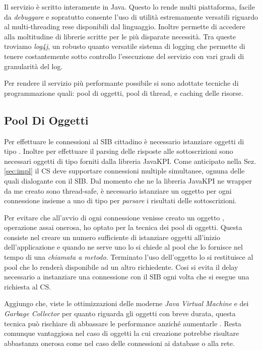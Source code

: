 Il servizio è scritto interamente in Java. Questo lo rende multi piattaforma, facile da \emph{debuggare} e sopratutto consente l'uso di utilità estremamente versatili riguardo al multi-threading rese disponibili dal linguaggio. Inoltre permette di accedere alla moltitudine di librerie scritte per le più disparate necessità. Tra queste troviamo \emph{log4j}, un robusto quanto versatile sistema di logging che permette di tenere costantemente sotto controllo l'esecuzione del servizio con vari gradi di granularità del log.

Per rendere il servizio più performante possibile si sono adottate tecniche di programmazione quali: pool di oggetti, pool di thread, e caching delle risorse.

\subsection{Pool Di Oggetti}

Per effettuare le connessioni al SIB cittadino è necessario istanziare oggetti di tipo . Inoltre per effettuare il parsing delle risposte alle sottoscrizioni sono necessari oggetti di tipo  forniti dalla libreria JavaKPI. Come anticipato nella Sez. \ref{sec:impl} il CS deve supportare connessioni multiple simultanee, ognuna delle quali dialogante con il SIB. Dal momento che ne la libreria JavaKPI ne wrapper da me creato sono thread-safe, è necessario istanziare un oggetto  per ogni connessione insieme a uno di tipo  per \emph{parsare} i risultati delle sottoscrizioni.

Per evitare che all'avvio di ogni connessione venisse creato un oggetto , operazione assai onerosa, ho optato per la tecnica dei pool di oggetti. Questa consiste nel creare un numero sufficiente di istanziare oggetti all'inizio dell'applicazione e quando ne serve uno lo si chiede al pool che lo fornisce nel tempo di una \emph{chiamata a metodo}. Terminato l'uso dell'oggetto lo si restituisce al pool che lo renderà disponibile ad un altro richiedente.
Cosi si evita il delay necessario a instanziare una connessione con il SIB ogni volta che si esegue una richiesta al CS.

Aggiungo che, viste le ottimizzazioni delle moderne \emph{Java Virtual Machine} e dei \emph{Garbage Collector} per quanto riguarda gli oggetti con breve durata, questa tecnica può rischiare di abbassare le performance anziché aumentarle \cite{torok2011}. Resta comunque vantaggiosa nel caso di oggetti la cui creazione potrebbe risultare abbastanza onerosa come nel caso delle connessioni ai database o alla rete.

